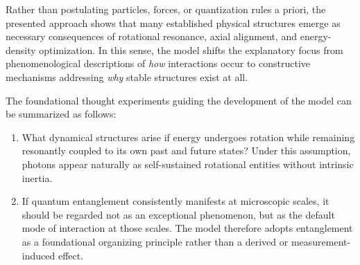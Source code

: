 \documentclass[11pt,a4paper]{article}
\begin{document}
Rather than postulating particles, forces, or quantization rules a priori, the presented approach shows that many established physical structures emerge as necessary consequences of rotational resonance, axial alignment, and energy-density optimization. In this sense, the model shifts the explanatory focus from phenomenological descriptions of \emph{how} interactions occur to constructive mechanisms addressing \emph{why} stable structures exist at all.

The foundational thought experiments guiding the development of the model can be summarized as follows:
\begin{enumerate}
  \item What dynamical structures arise if energy undergoes rotation while remaining resonantly coupled to its own past and future states? Under this assumption, photons appear naturally as self-sustained rotational entities without intrinsic inertia.
  \item If quantum entanglement consistently manifests at microscopic scales, it should be regarded not as an exceptional phenomenon, but as the default mode of interaction at those scales. The model therefore adopts entanglement as a foundational organizing principle rather than a derived or measurement-induced effect.
\end{enumerate}
\end{document}
